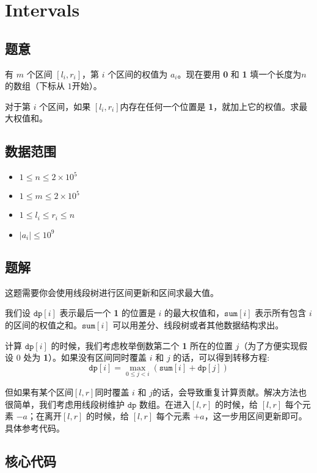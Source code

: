 \section{Intervals}
\subsection*{题意}
有 $m$ 个区间 $[l_i,r_i]$，第 $i$ 个区间的权值为 $a_i$。现在要用 \textbf{0} 和 \textbf{1} 填一个长度为$n$的数组（下标从 $1$开始）。

对于第 $i$ 个区间，如果 $[l_i,r_i]$内存在任何一个位置是 \textbf{1}，就加上它的权值。求最大权值和。


\subsection*{数据范围}
\begin{itemize}
\item $1 \leq n \leq 2\times 10^5$
\item $1 \leq m \leq 2\times 10^5$
\item $1 \leq l_i \leq r_i \leq n$
\item $|a_i| \leq 10^9$
\end{itemize}

\subsection*{题解}

这题需要你会使用线段树进行区间更新和区间求最大值。

我们设 $\texttt{dp}[i]$ 表示最后一个 \textbf{1} 的位置是 $i$ 的最大权值和，$\texttt{sum}[i]$ 表示所有包含 $i$ 的区间的权值之和。$\texttt{sum}[i]$ 可以用差分、线段树或者其他数据结构求出。

计算 $\texttt{dp}[i]$ 的时候，我们考虑枚举倒数第二个 \textbf{1} 所在的位置 $j$（为了方便实现假设 0 处为 \textbf{1}）。如果没有区间同时覆盖 $i$ 和 $j$ 的话，可以得到转移方程: 
$$
\texttt{dp}[i] = \max_{0\le j < i} (\texttt{sum}[i] + \texttt{dp}[j])
$$

但如果有某个区间$[l,r]$同时覆盖 $i$ 和 $j$的话，会导致重复计算贡献。解决方法也很简单，我们考虑用线段树维护 $\texttt{dp}$ 数组。在进入$[l,r]$ 的时候，给 $[l,r]$ 每个元素 ${-}a$；在离开$[l,r]$ 的时候，给 $[l,r]$ 每个元素 ${+}a$，这一步用区间更新即可。具体参考代码。

\newpage
\subsection*{核心代码}
\inputminted[linenos,autogobble]{cpp}{./Code/W.cpp}
\newpage